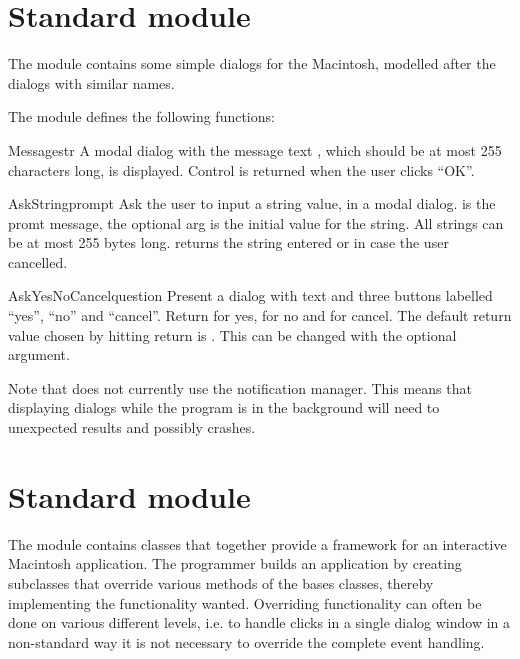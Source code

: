 \section{Standard module }

The  module contains some simple dialogs for
the Macintosh, modelled after the  dialogs with similar
names.

The  module defines the following functions:

\renewcommand{\indexsubitem}{(in module EasyDialogs)}

\begin{funcdesc}{Message}{str}
A modal dialog with the message text , which should be at
most 255 characters long, is displayed. Control is returned when the
user clicks ``OK''.
\end{funcdesc}

\begin{funcdesc}{AskString}{prompt}
Ask the user to input a string value, in a modal dialog. 
is the promt message, the optional  arg is the initial
value for the string. All strings can be at most 255 bytes
long.  returns the string entered or  in
case the user cancelled.
\end{funcdesc}

\begin{funcdesc}{AskYesNoCancel}{question}
Present a dialog with text  and three buttons labelled
``yes'', ``no'' and ``cancel''. Return  for yes,  for
no and  for cancel. The default return value chosen by
hitting return is . This can be changed with the optional
 argument.
\end{funcdesc}

Note that  does not currently use the notification
manager. This means that displaying dialogs while the program is in
the background will need to unexpected results and possibly crashes.


\section{Standard module }

The  module contains classes that together provide a
framework for an interactive Macintosh application. The programmer
builds an application by creating subclasses that override various
methods of the bases classes, thereby implementing the functionality
wanted. Overriding functionality can often be done on various
different levels, i.e. to handle clicks in a single dialog window in a
non-standard way it is not necessary to override the complete event
handling.

